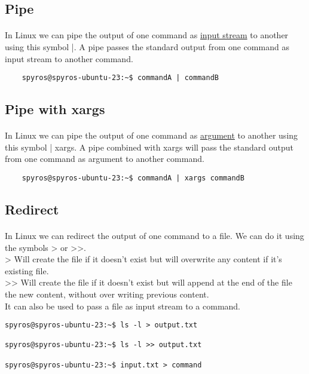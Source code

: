 \documentclass{article}
\begin{document}
\subsection{Pipe}
\paragraph{} In Linux we can pipe the output of one command as \underline{input stream} to another using this symbol |. A pipe passes the standard output from one command as input stream to another command.

\begin{lstlisting}
	spyros@spyros-ubuntu-23:~$ commandA | commandB

\end{lstlisting}

\subsection{Pipe with xargs}
\paragraph{} In Linux we can pipe the output of one command as \underline{argument} to another using this symbol | xargs. A pipe combined with xargs will pass the standard output from one command as argument to another command.

\begin{lstlisting}
	spyros@spyros-ubuntu-23:~$ commandA | xargs commandB

\end{lstlisting}

\subsection{Redirect}
\paragraph{} In Linux we can redirect the output of one command to a file. We can do it using the symbols > or >{}>.\\> Will create the file if it doesn't exist but will overwrite any content if it's existing file.\\>{}> Will create the file if it doesn't exist but will append at the end of the file the new content, without over writing previous content.\\It can also be used to pass a file as input stream to a command.
\begin{lstlisting}
spyros@spyros-ubuntu-23:~$ ls -l > output.txt

spyros@spyros-ubuntu-23:~$ ls -l >> output.txt

spyros@spyros-ubuntu-23:~$ input.txt > command

\end{lstlisting}
\end{document}
